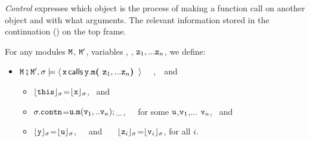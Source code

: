 \noindent 

\vspace{.2cm} \noindent
\textit{Control} expresses which object is the process of making a function call on another object and
with what arguments. The relevant information
 stored in the continuation () on the top frame.
\begin{definition}[%
Control]  \label{def:valid:assertion:control}
For any modules $\M$, $\M'$,  variables  , \y, $\prg{z}_1,...\prg{z}_n$, we define$:$
\begin{itemize}
   \item
$\M\mkpair \M', \sigma \models  \Calls {\prg{x}}  {\prg{m}} {\prg{y}}  {\z_1,...\z_n}$ \IFF \ \ ,\ \  and 
\begin{itemize}
\item
$\interp{\prg{this}}{\sigma}$=$\interp{\prg{x}}{\sigma}$, \ and
\item
$\sigma.\prg{contn}$=${\uu.\m(\v_1,..\v_n);\_}$,\ \ \ for some  $\uu$,$\v_1$,... $\v_n$, \ and
\item
 $\interp{\prg{y}}{\sigma}$=$\interp{\prg{u}}{\sigma}$,\ \ \ and \ \ \ 
  $\interp{\z_i}{\sigma}$=$\interp{{\prg{v}_i}}{\sigma}$, for all  $i$.
 \end{itemize}
  \end{itemize}
\end{definition}
